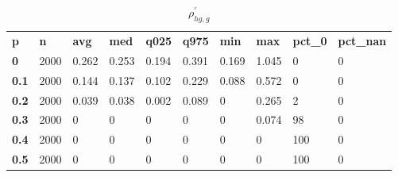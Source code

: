 \begin{table}[h]
 \centering 
\footnotesize
\caption{$\rho_{hg,g}^\prime $}
\label{tab:alphahgg}
\begin{tabular}[h]{| l l l l l l l l l l|
    } \hline
\textbf{ p} & \textbf{ n} & \textbf{ avg} & \textbf{ med} & \textbf{ q025} & \textbf{ q975} & \textbf{ min} & \textbf{ max} & \textbf{ pct\_0} & \textbf{ pct\_nan}
           \\
  \textbf{  0} & 2000 & 0.262 & 0.253 & 0.194 & 0.391 & 0.169 & 1.045 &   0 & 0
           \\
  \textbf{0.1} & 2000 & 0.144 & 0.137 & 0.102 & 0.229 & 0.088 & 0.572 &   0 & 0
           \\
  \textbf{0.2} & 2000 & 0.039 & 0.038 & 0.002 & 0.089 &     0 & 0.265 &   2 & 0
           \\
  \textbf{0.3} & 2000 &     0 &     0 &     0 &     0 &     0 & 0.074 &  98 & 0
           \\
  \textbf{0.4} & 2000 &     0 &     0 &     0 &     0 &     0 &     0 & 100 & 0
           \\
  \textbf{0.5} & 2000 &     0 &     0 &     0 &     0 &     0 &     0 & 100 & 0
           \\
 \hline \end{tabular}
 \end{table}
